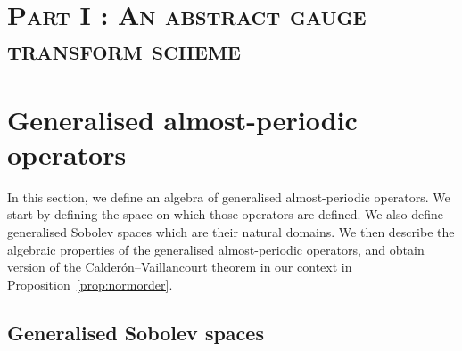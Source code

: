 \documentclass[10pt]{amsart}
\theoremstyle{definition}\newtheorem{defi}[theo]{Definition}\newtheorem{rema}[theo]{Remark}\newtheorem{exam}[theo]{Example}\newtheorem{nota}[theo]{Notation}
\begin{document}
\section*{\textsc{Part I : An abstract gauge transform scheme}}

\section{Generalised almost-periodic operators} \label{sec:operators}

In this section, we define an algebra of generalised almost-periodic operators. We start by defining the space on which those operators are defined. We also define generalised Sobolev spaces which are their natural domains. We then describe the algebraic properties of the generalised almost-periodic operators, and obtain version of the Calder\'on--Vaillancourt theorem in our context in Proposition~\ref{prop:normorder}.

\subsection{Generalised Sobolev spaces}
\end{document}
